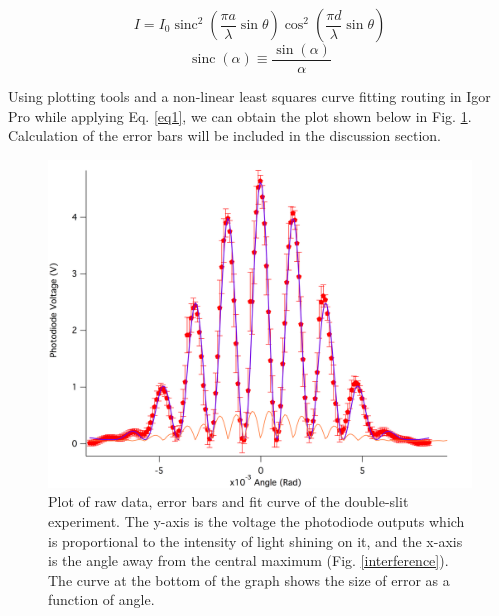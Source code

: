 \documentclass[prb,preprint]{revtex4-1}
\DeclareMathOperator{\sinc}{sinc}
\begin{document}

\begin{equation}
I=I_0 \sinc^2{\left(\frac{\pi a}{\lambda}\sin{\theta}\right)}  \cos^2{\left(\frac{\pi d}{\lambda} \sin \theta\right)}
\label{eq1}
\end{equation}
\begin{equation*}
\sinc(\alpha) \equiv \frac{\sin(\alpha)}{\alpha}
\end{equation*}

Using plotting tools and a non-linear least squares curve fitting routing in Igor Pro while applying Eq. \ref{eq1}, we can obtain the plot shown below in Fig. \ref{double}. Calculation of the error bars will be included in the discussion section.

\begin{figure}[h]
\centering
\includegraphics[width=7in]{double.png}
\caption{Plot of raw data, error bars and fit curve of the double-slit experiment. The y-axis is the voltage the photodiode outputs which is proportional to the intensity of light shining on it, and the x-axis is the angle away from the central maximum (Fig. \ref{interference}). The curve at the bottom of the graph shows the size of error as a function of angle.}
\label{double}
\end{figure}
\end{document}
